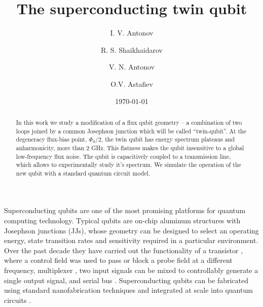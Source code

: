\documentclass[%
reprint,
superscriptaddress,
bibnotes,
amsmath,
amssymb,
aps,
showkeys,
prb,
]{revtex4-1}
\begin{document}

\title{The superconducting twin qubit}

\author{I.  V.  Antonov}   

\author{R. S.  Shaikhaidarov} 

\author{V.  N.  Antonov}   

\author{O.V.  Astafiev}   

\date{\today}%

\begin{abstract}
  In this work  we study a modification of  a flux qubit geometry --  a combination of
  two loops joined by a common Josephson  junction which will be called ``twin-qubit''.  At the degeneracy flux-bias point, $ \Phi_0/2 $, the twin qubit has energy
  spectrum plateaus and anharmonicity, more than 2 GHz. This flatness makes the qubit insensitive to
  a global  low-frequency flux  noise.  The  qubit is capacitively  coupled to  a transmission
  line, which  allows to experimentally  study it's  spectrum.
  We simulate the operation of the new qubit with a standard quantum circuit model.
\end{abstract}


\maketitle

Superconducting  qubits  are  one  of  the most  promising  platforms  for  quantum  computing
technology. Typical  qubits are  on-chip aluminum structures  with Josephson  junctions (JJs),
whose geometry  can be  designed to  select an  operating energy,  state transition  rates and
sensitivity required in a particular environment.  Over  the past decade they have carried out
the   functionality   of   a   transistor   \cite{Astafiev_2010,   Hoi_2011,   Abdumalikov_2010,
  Astafiev_2010_2},  where a  control field  was used  to pass or block a  probe field  at a
different  frequency,  multiplexer  \cite{H_nigl_Decrinis_2018},  two  input signals  can  be  mixed  to
controllably generate a single output signal, and serial bus \cite{Shen_2005}.  Superconducting
qubits can  be fabricated using  standard nanofabrication  techniques and integrated  at scale
into quantum circuits \cite{Johnson_2010}.
\end{document}
